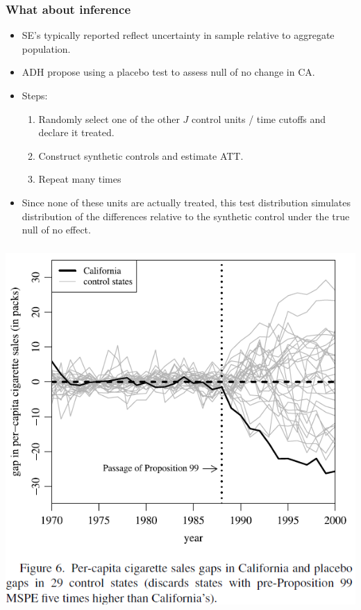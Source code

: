 \begin{frame}
  \frametitle{What about inference}
  \begin{itemize}
    \item SE's typically reported reflect uncertainty in sample relative to aggregate population. 
    \item ADH propose using a placebo test to assess null of no change in CA.
    \item Steps:
      \begin{enumerate}
        \item Randomly select one of the other $J$ control units / time cutoffs and declare it treated. 
        \item Construct synthetic controls and estimate ATT. 
        \item Repeat many times
      \end{enumerate}
    \item Since none of these units are actually treated, this test distribution simulates distribution of the differences relative to the synthetic control under the true null of no effect. 
  \end{itemize}
\end{frame}

\begin{frame}
  \frametitle{}
  \begin{center}
    \includegraphics[height=.9\textheight]{./resources/ADHPlacebo}
  \end{center}  
\end{frame}

